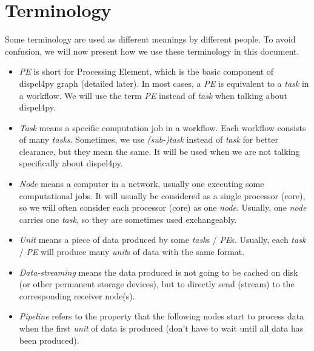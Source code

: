\chapter{Terminology}
Some terminology are used as different meanings by different people. To avoid confusion, we will now present how we use these terminology in this document.

\begin{itemize}
	\item \emph{PE} is short for Processing Element, which is the basic component of dispel4py graph (detailed later). In most cases, a \emph{PE} is equivalent to a \emph{task} in a workflow. We will use the term \emph{PE} instead of \emph{task} when talking about dispel4py.
	\item \emph{Task} means a specific computation job in a workflow. Each workflow consists of many \emph{tasks}. Sometimes, we use \emph{(sub-)task} instead of \emph{task} for better clearance, but they mean the same. It will be used when we are not talking specifically about dispel4py.
	\item \emph{Node} means a computer in a network, usually one executing some computational jobs. It will usually be considered as a single processor (core), so we will often consider each processor (core) as one \emph{node}. Usually, one \emph{node} carries one \emph{task}, so they are sometimes used exchangeably.
	\item \emph{Unit} means a piece of data produced by some \emph{task}s / \emph{PE}s. Usually, each \emph{task} / \emph{PE} will produce many \emph{unit}s of data with the same format.
	\item \emph{Data-streaming} means the data produced is not going to be cached on disk (or other permanent storage devices), but to directly send (\ie stream) to the corresponding receiver node(s).
	\item \emph{Pipeline} refers to the property that the following nodes start to process data when the first \emph{unit} of data is produced (\ie don't have to wait until all data has been produced).
\end{itemize}

